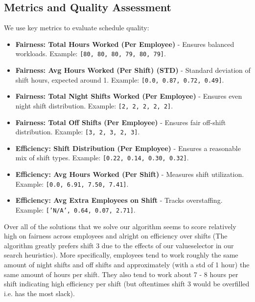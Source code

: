\documentclass[11pt]{article}
\begin{document}
\subsection*{Metrics and Quality Assessment}

We use key metrics to evaluate schedule quality:
\begin{itemize}
    \item \textbf{Fairness: Total Hours Worked (Per Employee)} - Ensures balanced workloads. Example: \texttt{[80, 80, 80, 79, 80, 79]}.
    \item \textbf{Fairness: Avg Hours Worked (Per Shift) (STD)} - Standard deviation of shift hours, expected around 1. Example: \texttt{[0.0, 0.87, 0.72, 0.49]}.
    \item \textbf{Fairness: Total Night Shifts Worked (Per Employee)} - Ensures even night shift distribution. Example: \texttt{[2, 2, 2, 2, 2]}.
    \item \textbf{Fairness: Total Off Shifts (Per Employee)} - Ensures fair off-shift distribution. Example: \texttt{[3, 2, 3, 2, 3]}.
    \item \textbf{Efficiency: Shift Distribution (Per Employee)} - Ensures a reasonable mix of shift types. Example: \texttt{[0.22, 0.14, 0.30, 0.32]}.
    \item \textbf{Efficiency: Avg Hours Worked (Per Shift)} - Measures shift utilization. Example: \texttt{[0.0, 6.91, 7.50, 7.41]}.
    \item \textbf{Efficiency: Avg Extra Employees on Shift} - Tracks overstaffing. Example: \texttt{['N/A', 0.64, 0.07, 2.71]}.
\end{itemize}

Over all of the solutions that we solve our algorithm seems to score relatively high on fairness across employees
and alright on efficiency over shifts (The algorithm greatly prefers shift 3 due to the effects of our valueselector in our search heuristics). 
More specifically, employees tend to work roughly the same amount of night shifts and off shifts and approximately (with a std of 1 hour) the same amount of hours per shift. 
They also tend to work about 7 - 8 hours per shift indicating high efficiency per shift (but oftentimes shift 3 would be overfilled i.e. has the most slack). 
\end{document}
